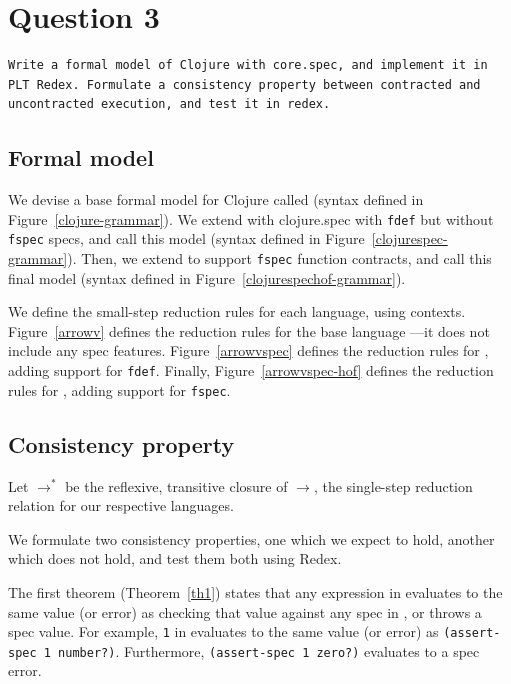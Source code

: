 \section{Question 3}

\begin{verbatim}
Write a formal model of Clojure with core.spec, and implement it in
PLT Redex. Formulate a consistency property between contracted and
uncontracted execution, and test it in redex.
\end{verbatim}

\subsection{Formal model}

%

We devise a base formal model for Clojure called \lambdac{}
(syntax defined in Figure~\ref{clojure-grammar}).
We extend \lambdac{} with clojure.spec with \texttt{fdef} but without 
\texttt{fspec} specs, and call
this model \lambdacs{}
(syntax defined in Figure~\ref{clojurespec-grammar}).
Then, we extend \lambdacs{} to support
\texttt{fspec} function contracts, and call this final model \lambdacsf{}
(syntax defined in Figure~\ref{clojurespechof-grammar}).

We define the small-step reduction rules for each language, using contexts.
Figure~\ref{arrowv} defines the reduction rules for 
the base language \lambdac{}---it does not include any spec features.
Figure~\ref{arrowvspec} defines the reduction rules for 
\lambdacs{}, adding support for \texttt{fdef}.
Finally, Figure~\ref{arrowvspec-hof} defines the reduction rules for 
\lambdacsf{}, adding support for \texttt{fspec}.

\subsection{Consistency property}

Let $\rightarrow^{*}$ be the reflexive, transitive closure of $\rightarrow$,
the single-step reduction relation for our respective languages.

We formulate two consistency properties, one which we expect to hold, another
which does not hold, and test them both using Redex.

The first theorem (Theorem~\ref{th1}) states that any expression in \lambdac{}
evaluates to the same value (or error) as checking that value against
any spec in \lambdacs{}, or throws a spec value.
For example, \texttt{1} in \lambdac{} evaluates to the same value (or error)
as \texttt{(assert-spec 1 number?)}. Furthermore, \texttt{(assert-spec 1 zero?)} 
evaluates to a spec error.

